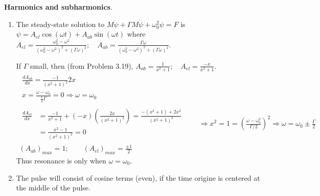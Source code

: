 \documentclass[twoside,10pt]{amsart}
\newcommand{\problemhead}[1]
  {\smallskip
   \noindent{\large\bf Problem #1.}
   \smallskip}
\begin{document}
\problemhead{3.36} \textbf{ Harmonics and subharmonics}.   
\begin{enumerate}
  \item The steady-state solution to $M \ddot{\psi}  + \Gamma M \dot{\psi} + \omega_0^2 \psi = F$ is \\
$ \psi = A_{el} \cos{ (\omega t)} + A_{ab} \sin{ (\omega t) }$ where $A_{el} = \frac{ \omega_0^2 - \omega^2 }{ (\omega_0^2 - \omega^2 )^2  + (\Gamma \omega )^2 }; \quad A_{ab} = \frac{ \Gamma \omega }{ (\omega_0^2 - \omega^2)^2 + (\Gamma \omega)^2 }$.  

If $\Gamma$ small, then (from Problem 3.19), $A_{ab} = \frac{1}{ x^2 + 1 } ; \quad A_{el} = \frac{ -x}{ x^2 + 1 }$.  
\[
\begin{gathered}
  \begin{gathered}
    \frac{ d A_{ab}}{ dx}  = \frac{-1}{ (x^2 + 1)^2 } 2x \\
    x = \frac{ \omega - \omega_0}{ \frac{1}{2} \Gamma } = 0 \Longrightarrow \omega = \omega_0 
  \end{gathered} \\
  \begin{aligned}
    \frac{d A_{el}}{ dx} & = \frac{-1}{ x^2 + 1 } + (-x)\left( \frac{ 2x}{ (x^2 + 1 )^2 } \right) = \frac{ - (x^2 + 1 ) + 2x^2 }{ (x^2 + 1)^2 } \\
    & = \frac{ x^2 - 1 }{ (x^2 + 1)^2 } = 0 
  \end{aligned} \quad \quad \Longrightarrow x^2 = 1 = \left( \frac{ \omega - \omega_0^2 }{ \Gamma/2} \right)^2 \Longrightarrow \omega = \omega_0 \pm \frac{\Gamma}{2} \\
  (A_{ab})_{max} = 1 ; \quad \quad (A_{el})_{max} = \frac{ \pm 1 }{2} 
\end{gathered}
\]
Thus resonance is only when $\omega = \omega_0$.  
  \item The pulse will consist of cosine terms (even), if the time origine is centered at the middle of the pulse.  


\end{enumerate}
\end{document}
